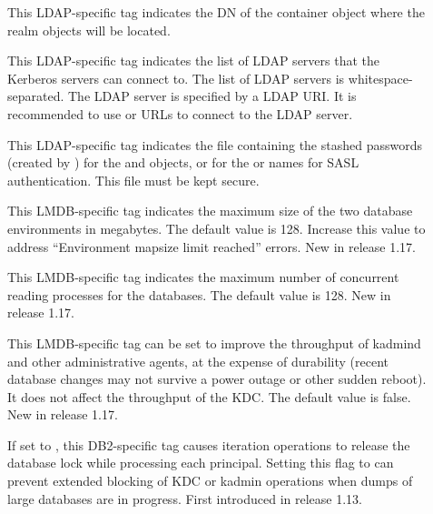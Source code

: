 \documentclass[letterpaper,10pt,english]{sphinxmanual}
\begin{document}
\begin{description}
\item[{}] \leavevmode
This LDAP-specific tag indicates the DN of the container object
where the realm objects will be located.

\item[{}] \leavevmode
This LDAP-specific tag indicates the list of LDAP servers that the
Kerberos servers can connect to.  The list of LDAP servers is
whitespace-separated.  The LDAP server is specified by a LDAP URI.
It is recommended to use  or  URLs to connect
to the LDAP server.

\item[{}] \leavevmode
This LDAP-specific tag indicates the file containing the stashed
passwords (created by ) for the
 and  objects, or for the
 or  names
for SASL authentication.  This file must be kept secure.

\item[{}] \leavevmode
This LMDB-specific tag indicates the maximum size of the two
database environments in megabytes.  The default value is 128.
Increase this value to address “Environment mapsize limit reached”
errors.  New in release 1.17.

\item[{}] \leavevmode
This LMDB-specific tag indicates the maximum number of concurrent
reading processes for the databases.  The default value is 128.
New in release 1.17.

\item[{}] \leavevmode
This LMDB-specific tag can be set to improve the throughput of
kadmind and other administrative agents, at the expense of
durability (recent database changes may not survive a power outage
or other sudden reboot).  It does not affect the throughput of the
KDC.  The default value is false.  New in release 1.17.

\item[{}] \leavevmode
If set to , this DB2-specific tag causes iteration
operations to release the database lock while processing each
principal.  Setting this flag to  can prevent extended
blocking of KDC or kadmin operations when dumps of large databases
are in progress.  First introduced in release 1.13.

\end{description}
\end{document}
